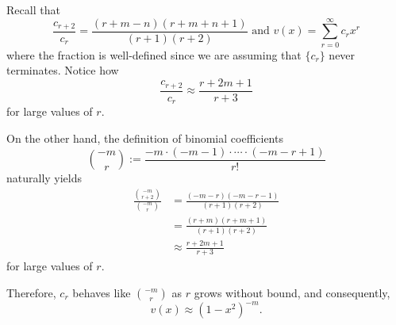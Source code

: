 \item
Recall that
\[
	\frac{c_{r + 2}}{c_r} = \frac{(r + m - n)(r + m + n + 1)}{(r + 1)(r + 2)}
	\text{ and } v(x) = \sum_{r=0}^\infty c_r x^r
\]
where the fraction is well-defined since we are assuming that $\{c_r\}$ never terminates.
Notice how
\[
	\frac{c_{r + 2}}{c_r} \approx \frac{r + 2m  + 1}{r + 3}
\]
for large values of $r$.

On the other hand, the definition of binomial coefficients
\[
	\binom{-m}{r} := \frac{-m \cdot (-m - 1) \cdot \cdots \cdot (-m - r + 1)}{r!}
\]
naturally yields
\begin{align*}
	\frac{\binom{-m}{r + 2}}{\binom{-m}{r}}
	&= \frac{(-m - r)(-m - r - 1)}{(r + 1)(r + 2)} \\
	&= \frac{(r + m)(r + m + 1)}{(r + 1)(r + 2)} \\
	&\approx \frac{r + 2m + 1}{r + 3}
\end{align*}
for large values of $r$.

Therefore, $c_r$ behaves like $\binom{-m}{r}$ as $r$ grows without bound, and consequently,
\[
	v(x) \approx {\left( 1 - x^2 \right)}^{-m}.
\]